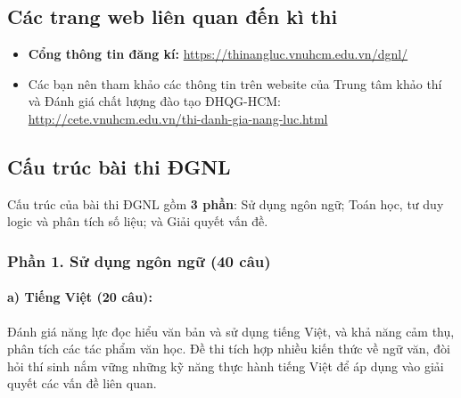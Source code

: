 \subsection{Các trang web liên quan đến kì thi}
\begin{itemize}
    \item \textbf{Cổng thông tin đăng kí:} \href{https://thinangluc.vnuhcm.edu.vn/dgnl/}{https://thinangluc.vnuhcm.edu.vn/dgnl/} \cite{webdangki}
    \item Các bạn nên tham khảo các thông tin trên website của Trung tâm khảo thí và Đánh giá chất lượng đào tạo ĐHQG-HCM: \href{http://cete.vnuhcm.edu.vn/thi-danh-gia-nang-luc.html}{http://cete.vnuhcm.edu.vn/thi-danh-gia-nang-luc.html} \cite{cetevnuhcm}
\end{itemize}

\subsection{Cấu trúc bài thi ĐGNL}
\label{cautrucbaithi}
Cấu trúc của bài thi ĐGNL gồm \textbf{3 phần}: Sử dụng ngôn ngữ; Toán học, tư duy logic và
phân tích số liệu; và Giải quyết vấn đề.
\subsubsection{Phần 1. Sử dụng ngôn ngữ (40 câu)}
\paragraph{a) Tiếng Việt (20 câu):}Đánh giá năng lực đọc hiểu văn bản và sử dụng tiếng Việt, và khả năng cảm thụ, phân tích các tác phẩm văn học. Đề thi tích hợp nhiều kiến thức về ngữ văn, đòi hỏi thí sinh nắm vững những kỹ năng thực hành tiếng Việt để áp dụng vào giải quyết các vấn đề liên quan.
\par

